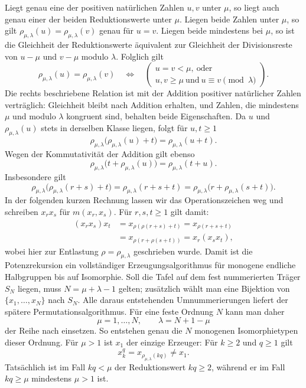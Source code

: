 \documentclass[main.tex]{subfiles}
\begin{document}
Liegt genau eine der positiven natürlichen Zahlen \(u,v\) unter \(\mu\), so
liegt auch genau einer der beiden Reduktionswerte unter \(\mu\).  Liegen beide
Zahlen unter \(\mu\), so gilt
\(\rho_{\mu,\lambda}(u)=\rho_{\mu,\lambda}(v)\) genau für \(u=v\).
Liegen beide mindestens bei \(\mu\), so ist die Gleichheit der
Reduktionswerte äquivalent zur Gleichheit der Divisionsreste von
\(u-\mu\) und \(v-\mu\) modulo \(\lambda\).  Folglich gilt
\[
  \rho_{\mu,\lambda}(u)=\rho_{\mu,\lambda}(v)
  \quad\Longleftrightarrow\quad
  \left(
    \begin{array}{l}
      u=v<\mu,\ \text{oder}\\
      u,v\geq\mu\ \text{und}\ u\equiv v\pmod\lambda
    \end{array}
  \right).
\]
Die rechts beschriebene Relation ist mit der Addition positiver natürlicher
Zahlen verträglich: Gleichheit bleibt nach Addition erhalten, und Zahlen, die
mindestens \(\mu\) und modulo \(\lambda\) kongruent sind, behalten beide
Eigenschaften.  Da \(u\) und \(\rho_{\mu,\lambda}(u)\) stets in derselben
Klasse liegen, folgt für \(u,t\geq1\)
\[
  \rho_{\mu,\lambda}\bigl(\rho_{\mu,\lambda}(u)+t\bigr)
  =
  \rho_{\mu,\lambda}(u+t).
\]
Wegen der Kommutativität der Addition gilt ebenso
\[
  \rho_{\mu,\lambda}\bigl(t+\rho_{\mu,\lambda}(u)\bigr)
  =
  \rho_{\mu,\lambda}(t+u).
\]
Insbesondere gilt
\[
  \rho_{\mu,\lambda}\!
    \bigl(\rho_{\mu,\lambda}(r+s)+t\bigr)
  =
  \rho_{\mu,\lambda}(r+s+t)
  =
  \rho_{\mu,\lambda}\!
    \bigl(r+\rho_{\mu,\lambda}(s+t)\bigr).
\]
In der folgenden kurzen Rechnung lassen wir das Operationszeichen weg und
schreiben \(x_rx_s\) für \(m(x_r,x_s)\).  Für \(r,s,t\geq1\) gilt damit:
\[
\begin{aligned}
  (x_r x_s)x_t
  &=x_{\rho(\rho(r+s)+t)}
   =x_{\rho(r+s+t)}\\
  &=x_{\rho(r+\rho(s+t))}
   =x_r(x_sx_t),
\end{aligned}
\]
wobei hier zur Entlastung \(\rho=\rho_{\mu,\lambda}\) geschrieben wurde.
Damit ist die Potenzrekursion ein vollständiger Erzeugungsalgorithmus für
monogene endliche Halbgruppen bis auf Isomorphie.  Soll die Tafel auf dem
fest nummerierten Träger \(S_N\) liegen, muss
\(N=\mu+\lambda-1\) gelten; zusätzlich wählt man eine Bijektion von
\(\{x_1,\ldots,x_N\}\) nach \(S_N\).  Alle daraus entstehenden
Umnummerierungen liefert der spätere Permutationsalgorithmus.  Für eine feste
Ordnung \(N\) kann man daher
\[
  \mu=1,\ldots,N,
  \qquad
  \lambda=N+1-\mu
\]
der Reihe nach einsetzen.  So entstehen genau die \(N\) monogenen
Isomorphietypen dieser Ordnung.  Für \(\mu>1\) ist \(x_1\) der einzige
Erzeuger: Für \(k\geq2\) und \(q\geq1\) gilt
\[
  x_k^q=x_{\rho_{\mu,\lambda}(kq)}\neq x_1.
\]
Tatsächlich ist im Fall \(kq<\mu\) der Reduktionswert \(kq\geq2\), während
er im Fall \(kq\geq\mu\) mindestens \(\mu>1\) ist.
\end{document}
